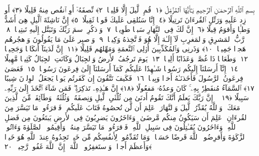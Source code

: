 
  
    
  
    
    

\nopagebreak
  بِسمِ ٱللَّهِ ٱلرَّحمَـٰنِ ٱلرَّحِيمِ
  يَـٰٓأَيُّهَا ٱلمُزَّمِّلُ ﴿١﴾
 قُمِ ٱلَّيلَ إِلَّا قَلِيلًۭا ﴿٢﴾
 نِّصفَهُۥٓ أَوِ ٱنقُص مِنهُ قَلِيلًا ﴿٣﴾
 أَو زِد عَلَيهِ وَرَتِّلِ ٱلقُرءَانَ تَرتِيلًا ﴿٤﴾
 إِنَّا سَنُلقِى عَلَيكَ قَولًۭا ثَقِيلًا ﴿٥﴾
 إِنَّ نَاشِئَةَ ٱلَّيلِ هِىَ أَشَدُّ وَطـًۭٔا وَأَقوَمُ قِيلًا ﴿٦﴾
 إِنَّ لَكَ فِى ٱلنَّهَارِ سَبحًۭا طَوِيلًۭا ﴿٧﴾
 وَٱذكُرِ ٱسمَ رَبِّكَ وَتَبَتَّل إِلَيهِ تَبتِيلًۭا ﴿٨﴾
 رَّبُّ ٱلمَشرِقِ وَٱلمَغرِبِ لَآ إِلَـٰهَ إِلَّا هُوَ فَٱتَّخِذهُ وَكِيلًۭا ﴿٩﴾
 وَٱصبِر عَلَىٰ مَا يَقُولُونَ وَٱهجُرهُم هَجرًۭا جَمِيلًۭا ﴿١٠﴾
 وَذَرنِى وَٱلمُكَذِّبِينَ أُو۟لِى ٱلنَّعمَةِ وَمَهِّلهُم قَلِيلًا ﴿١١﴾
 إِنَّ لَدَينَآ أَنكَالًۭا وَجَحِيمًۭا ﴿١٢﴾
 وَطَعَامًۭا ذَا غُصَّةٍۢ وَعَذَابًا أَلِيمًۭا ﴿١٣﴾
 يَومَ تَرجُفُ ٱلأَرضُ وَٱلجِبَالُ وَكَانَتِ ٱلجِبَالُ كَثِيبًۭا مَّهِيلًا ﴿١٤﴾
 إِنَّآ أَرسَلنَآ إِلَيكُم رَسُولًۭا شَـٰهِدًا عَلَيكُم كَمَآ أَرسَلنَآ إِلَىٰ فِرعَونَ رَسُولًۭا ﴿١٥﴾
 فَعَصَىٰ فِرعَونُ ٱلرَّسُولَ فَأَخَذنَـٰهُ أَخذًۭا وَبِيلًۭا ﴿١٦﴾
 فَكَيفَ تَتَّقُونَ إِن كَفَرتُم يَومًۭا يَجعَلُ ٱلوِلدَٟنَ شِيبًا ﴿١٧﴾
 ٱلسَّمَآءُ مُنفَطِرٌۢ بِهِۦ ۚ كَانَ وَعدُهُۥ مَفعُولًا ﴿١٨﴾
 إِنَّ هَـٰذِهِۦ تَذكِرَةٌۭ ۖ فَمَن شَآءَ ٱتَّخَذَ إِلَىٰ رَبِّهِۦ سَبِيلًا ﴿١٩﴾
 ۞ إِنَّ رَبَّكَ يَعلَمُ أَنَّكَ تَقُومُ أَدنَىٰ مِن ثُلُثَىِ ٱلَّيلِ وَنِصفَهُۥ وَثُلُثَهُۥ وَطَآئِفَةٌۭ مِّنَ ٱلَّذِينَ مَعَكَ ۚ وَٱللَّهُ يُقَدِّرُ ٱلَّيلَ وَٱلنَّهَارَ ۚ عَلِمَ أَن لَّن تُحصُوهُ فَتَابَ عَلَيكُم ۖ فَٱقرَءُوا۟ مَا تَيَسَّرَ مِنَ ٱلقُرءَانِ ۚ عَلِمَ أَن سَيَكُونُ مِنكُم مَّرضَىٰ ۙ وَءَاخَرُونَ يَضرِبُونَ فِى ٱلأَرضِ يَبتَغُونَ مِن فَضلِ ٱللَّهِ ۙ وَءَاخَرُونَ يُقَـٰتِلُونَ فِى سَبِيلِ ٱللَّهِ ۖ فَٱقرَءُوا۟ مَا تَيَسَّرَ مِنهُ ۚ وَأَقِيمُوا۟ ٱلصَّلَوٰةَ وَءَاتُوا۟ ٱلزَّكَوٰةَ وَأَقرِضُوا۟ ٱللَّهَ قَرضًا حَسَنًۭا ۚ وَمَا تُقَدِّمُوا۟ لِأَنفُسِكُم مِّن خَيرٍۢ تَجِدُوهُ عِندَ ٱللَّهِ هُوَ خَيرًۭا وَأَعظَمَ أَجرًۭا ۚ وَٱستَغفِرُوا۟ ٱللَّهَ ۖ إِنَّ ٱللَّهَ غَفُورٌۭ رَّحِيمٌۢ ﴿٢٠﴾
 
